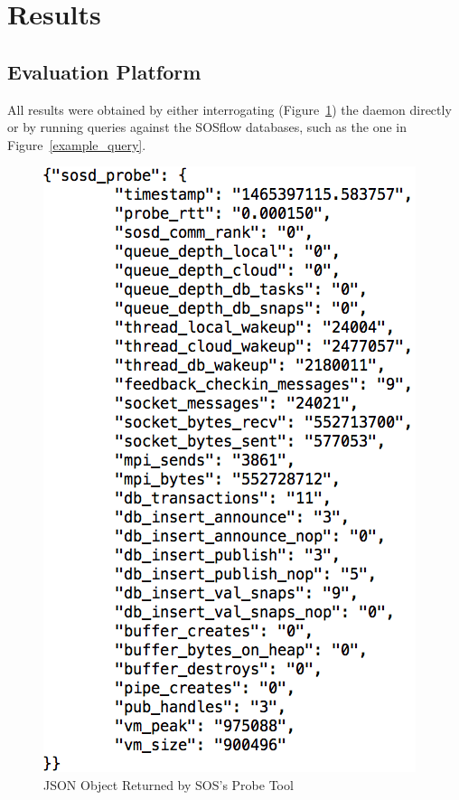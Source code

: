 
\section{Results} %
\subsection{Evaluation Platform} %
All results were obtained by either interrogating
(Figure~\ref{probe_json}) the daemon directly or by running queries
against the SOSflow databases, such as the one in
Figure~\ref{example_query}.
%
\begin{figure}[h]
  \centering
  \includegraphics[width=\columnwidth]{images/probe_json_example.png}
  \caption{JSON Object Returned by SOS's Probe Tool}
  \label{probe_json}
\end{figure}
%
%
%


